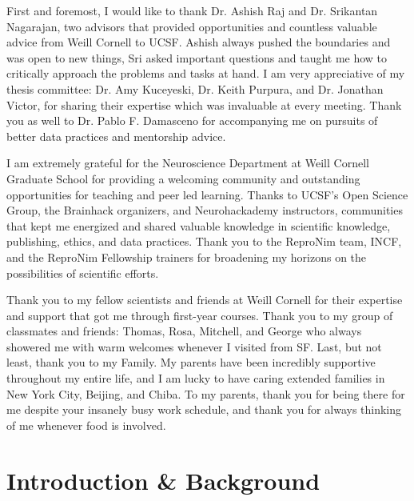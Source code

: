 \documentclass[phd,tocprelim]{cornell}
\begin{document}
\begin{acknowledgements}
First and foremost, I would like to thank Dr. Ashish Raj and Dr. Srikantan Nagarajan, two advisors that provided opportunities and countless valuable advice from Weill Cornell to UCSF. Ashish always pushed the boundaries and was open to new things, Sri asked important questions and taught me how to critically approach the problems and tasks at hand. I am very appreciative of my thesis committee: Dr. Amy Kuceyeski, Dr. Keith Purpura, and Dr. Jonathan Victor, for sharing their expertise which was invaluable at every meeting. Thank you as well to Dr. Pablo F. Damasceno for accompanying me on pursuits of better data practices and mentorship advice.

I am extremely grateful for the Neuroscience Department at Weill Cornell Graduate School for providing a welcoming community and outstanding opportunities for teaching and peer led learning. Thanks to UCSF's Open Science Group, the Brainhack organizers, and Neurohackademy instructors, communities that kept me energized and shared valuable knowledge in scientific knowledge, publishing, ethics, and data practices. Thank you to the ReproNim team, INCF, and the ReproNim Fellowship trainers for broadening my horizons on the possibilities of scientific efforts. 

Thank you to my fellow scientists and friends at Weill Cornell for their expertise and support that got me through first-year courses. Thank you to my group of classmates and friends: Thomas, Rosa, Mitchell, and George who always showered me with warm welcomes whenever I visited from SF. Last, but not least, thank you to my Family. My parents have been incredibly supportive throughout my entire life, and I am lucky to have caring extended families in New York City, Beijing, and Chiba. To my parents, thank you for being there for me despite your insanely busy work schedule, and thank you for always thinking of me whenever food is involved.  
\end{acknowledgements}

\contentspage
\tablelistpage
\figurelistpage

\normalspacing \setcounter{page}{1} 
\pagestyle{cornell} \addtolength{\parskip}{0.5\baselineskip}

\chapter{Introduction \& Background}

\end{document}
